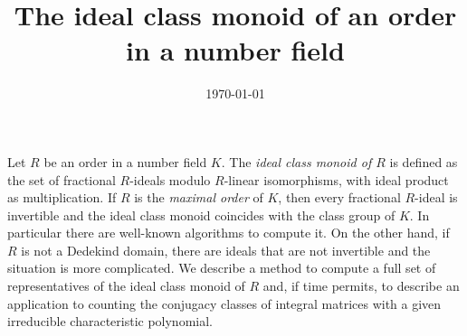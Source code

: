 \documentclass[a4paper,12pt]{amsart} %
\title{The ideal class monoid of an order in a number field}
\date{\today}
\begin{document}
\maketitle
Let $R$ be an order in a number field $K$. The \emph{ideal class monoid of $R$} is defined as the set of fractional $R$-ideals modulo $R$-linear isomorphisms, with ideal product as multiplication. If $R$ is the \emph{maximal order} of $K$, then every fractional $R$-ideal is invertible and the ideal class monoid coincides with the class group of $K$. In particular there are well-known algorithms to compute it.
On the other hand, if $R$ is not a Dedekind domain, there are ideals that are not invertible and the situation is more complicated. We describe a method to compute a full set of representatives of the ideal class monoid of $R$ and, if time permits, to describe an application to counting the conjugacy classes of integral matrices with a given irreducible characteristic polynomial.
\end{document}
